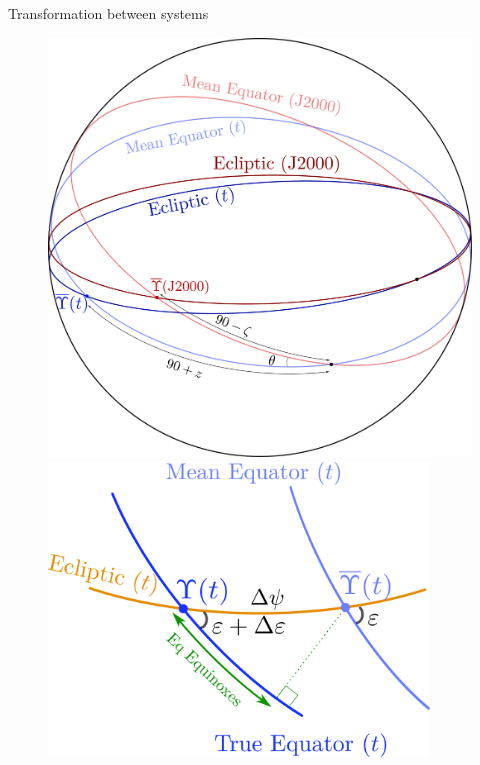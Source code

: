 \documentclass{beamer} %
\begin{document}
\begin{frame}{Transformation between systems}



  \begin{figure}[htbp]
    \centering
    \begin{minipage}[ht]{0.3\textwidth}
      \centering
      \includegraphics[width=\textwidth]{../Images/ecliptic_equator.pdf}
    \end{minipage}
    \hspace{0.025\textwidth}
    \begin{minipage}[ht]{0.3\textwidth}
      \centering
      \includegraphics[width=0.9\textwidth]{../Images/nutation_matrix.pdf}

\end{minipage}
\end{figure}
\end{frame}
\end{document}
